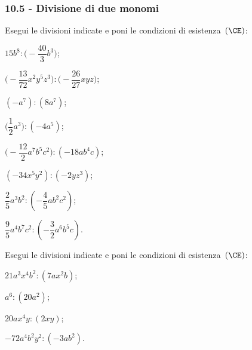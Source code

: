 \subsubsection*{10.5 - Divisione di due monomi}
\begin{esercizio}[\Ast]
 \label{ese:10.20} %
Esegui le divisioni indicate e poni le condizioni di esistenza~$(\CE)$:
\begin{multicols}{2}
\begin{enumeratea}
\spazielenx
 \item $15b^{8}:\bigg(-{\dfrac{40}{3}}b^{3}\bigg)$;
 \item $\bigg(-{\dfrac{13}{72}}x^{2}y^{5}z^{3}\bigg):\bigg(-{\dfrac{26}{27}}xyz\bigg)$;
 \item $(-a^{7}):(8a^{7})$;
 \item $\bigg(\dfrac{1}{2}a^{3}\bigg):(-4a^{5})$;
 \item $\bigg(-{\dfrac{12}{2}}a^{7}b^{5}c^{2}\bigg):(-18ab^{4}c)$;
 \item $(-34x^{5}y^{2}):(-2yz^{3})$;
 \item $\dfrac{2}{5}a^3b^2:\left(-\dfrac{4}{5}ab^2c^2\right)$;
 \item $\dfrac{9}{5}a^4b^7c^2:\left(-\dfrac{3}{2}a^6b^5c\right)$.
\end{enumeratea}
\end{multicols}
\end{esercizio}

\begin{esercizio}[\Ast]
 \label{ese:10.21} %
Esegui le divisioni indicate e poni le condizioni di esistenza~$(\CE)$:
\begin{multicols}{2}
\begin{enumeratea}
 \item $21a^{3}x^{4}b^{2}:\left(7ax^{2}b\right)$;
 \item $a^{6}:\left(20a^{2}\right)$;
 \item $20ax^{4}y:(2xy)$;
 \item $-72a^{4}b^{2}y^{2}:(-3ab^{2})$.
\end{enumeratea}
\end{multicols}
\end{esercizio}

